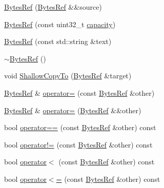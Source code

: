 \begin{DoxyCompactItemize}
\item 
\mbox{\hyperlink{classlucene_1_1core_1_1util_1_1BytesRef_aaf642591663f6bcb7315f017aa6fcd35}{Bytes\+Ref}} (\mbox{\hyperlink{classlucene_1_1core_1_1util_1_1BytesRef}{Bytes\+Ref}} \&\&source)
\item 
\mbox{\hyperlink{classlucene_1_1core_1_1util_1_1BytesRef_add244078b49f9f132839a804f1312223}{Bytes\+Ref}} (const uint32\+\_\+t \mbox{\hyperlink{classlucene_1_1core_1_1util_1_1BytesRef_a9e1775d26ac1dec137aa57fae87f654c}{capacity}})
\item 
\mbox{\hyperlink{classlucene_1_1core_1_1util_1_1BytesRef_a27fd90759a52d4ea1fe88e5af2f7bb92}{Bytes\+Ref}} (const std\+::string \&text)
\item 
\mbox{\hyperlink{classlucene_1_1core_1_1util_1_1BytesRef_a7c9d7930ac1511839e4cd2f551e8a78a}{$\sim$\+Bytes\+Ref}} ()
\item 
void \mbox{\hyperlink{classlucene_1_1core_1_1util_1_1BytesRef_a2f75314d896984075dfd351b4d8e3e49}{Shallow\+Copy\+To}} (\mbox{\hyperlink{classlucene_1_1core_1_1util_1_1BytesRef}{Bytes\+Ref}} \&target)
\item 
\mbox{\hyperlink{classlucene_1_1core_1_1util_1_1BytesRef}{Bytes\+Ref}} \& \mbox{\hyperlink{classlucene_1_1core_1_1util_1_1BytesRef_a83163bf442814183adc151dccf70bc73}{operator=}} (const \mbox{\hyperlink{classlucene_1_1core_1_1util_1_1BytesRef}{Bytes\+Ref}} \&other)
\item 
\mbox{\hyperlink{classlucene_1_1core_1_1util_1_1BytesRef}{Bytes\+Ref}} \& \mbox{\hyperlink{classlucene_1_1core_1_1util_1_1BytesRef_adf99f31bbffbdd8f91ef62b0e0c19337}{operator=}} (\mbox{\hyperlink{classlucene_1_1core_1_1util_1_1BytesRef}{Bytes\+Ref}} \&\&other)
\item 
bool \mbox{\hyperlink{classlucene_1_1core_1_1util_1_1BytesRef_a1f856405da2816cb3bf448507e296d97}{operator==}} (const \mbox{\hyperlink{classlucene_1_1core_1_1util_1_1BytesRef}{Bytes\+Ref}} \&other) const
\item 
bool \mbox{\hyperlink{classlucene_1_1core_1_1util_1_1BytesRef_a06c0da4f9479190bee2e32791531bbc9}{operator!=}} (const \mbox{\hyperlink{classlucene_1_1core_1_1util_1_1BytesRef}{Bytes\+Ref}} \&other) const
\item 
bool \mbox{\hyperlink{classlucene_1_1core_1_1util_1_1BytesRef_ae91fb3040f390277b694dbb706a04860}{operator$<$}} (const \mbox{\hyperlink{classlucene_1_1core_1_1util_1_1BytesRef}{Bytes\+Ref}} \&other) const
\item 
bool \mbox{\hyperlink{classlucene_1_1core_1_1util_1_1BytesRef_a819f7a557975f9a9145bf62c50a1fcee}{operator$<$=}} (const \mbox{\hyperlink{classlucene_1_1core_1_1util_1_1BytesRef}{Bytes\+Ref}} \&other) const

\end{DoxyCompactItemize}
